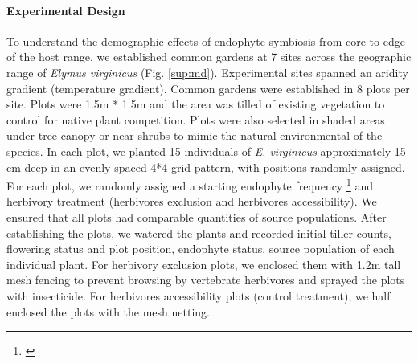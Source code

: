 \documentclass[12pt]{article}\usepackage[]{graphicx}\usepackage[dvipsnames]{xcolor}
\newcommand{\jacob}[2]{{\color{blue}{#1}}\footnote{\textit{\color{blue}{#2}}}}
\begin{document}
\paragraph {Experimental Design} 
To understand the demographic effects of endophyte symbiosis from core to edge of the host range, we established  common gardens at 7 sites across the geographic range of \emph {Elymus virginicus} (Fig. \ref{sup:md}).
Experimental sites spanned an aridity gradient (temperature gradient).
Common gardens were established in 8 plots per site. 
Plots were 1.5m * 1.5m and the area was tilled of existing vegetation to control for native plant competition.
Plots were also selected in shaded areas under tree canopy or near shrubs to mimic the natural environmental of the species.
In each plot,  we planted 15 individuals  of \emph{E. virginicus} approximately 15 cm deep in an evenly spaced 4*4 grid pattern, with positions randomly assigned. 
For each plot, we randomly assigned a starting endophyte frequency  \jacob{(80\%, 60\%, 40\%, 20\%)}{Do we need a schematic of one replicate
of the experimental design?} and herbivory treatment (herbivores exclusion and herbivores accessibility). 
We ensured that all plots had comparable quantities of source populations.
After establishing the plots, we watered the plants and recorded initial tiller counts, flowering status and plot position,  endophyte status, source population of each individual plant. 
For herbivory exclusion plots, we enclosed them with 1.2m tall mesh fencing to prevent browsing by vertebrate herbivores and sprayed the plots with insecticide. 
For herbivores accessibility plots (control treatment), we half enclosed the plots with the mesh netting.
\end{document}
